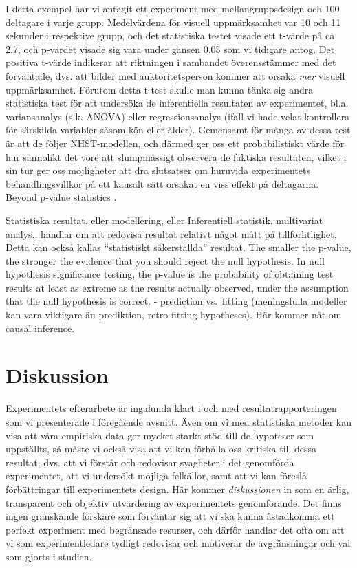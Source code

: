 \documentclass[
]{book}
\begin{document}
I detta exempel har vi antagit ett experiment med mellangruppsdesign och 100 deltagare i varje grupp. Medelvärdena för visuell uppmärksamhet var 10 och 11 sekunder i respektive grupp, och det statistiska testet visade ett t-värde på ca 2.7, och p-värdet visade sig vara under gänsen 0.05 som vi tidigare antog. Det positiva t-värde indikerar att riktningen i sambandet överensstämmer med det förväntade, dvs. att bilder med auktoritetsperson kommer att orsaka \emph{mer} visuell uppmärksamhet. Förutom detta t-test skulle man kunna tänka sig andra statistiska test för att undersöka de inferentiella resultaten av experimentet, bl.a. variansanalys (s.k. ANOVA) eller regressionsanalys (ifall vi hade velat kontrollera för särskilda variabler såsom kön eller ålder). Gemensamt för många av dessa test är att de följer NHST-modellen, och därmed ger oss ett probabilistiskt värde för hur sannolikt det vore att slumpmässigt observera de faktiska resultaten, vilket i sin tur ger oss möjligheter att dra slutsatser om huruvida experimentets behandlingsvillkor på ett kausalt sätt orsakat en viss effekt på deltagarna. Beyond p-value statistics \citep{trafimow2015editorial}.

Statistiska resultat, eller modellering, eller Inferentiell statistik, multivariat analys.. handlar om att redovisa resultat relativt något mått på tillförlitlighet. Detta kan också kallas ``statistiskt säkerställda'' resultat. The smaller the p-value, the stronger the evidence that you should reject the null hypothesis. In null hypothesis significance testing, the p-value is the probability of obtaining test results at least as extreme as the results actually observed, under the assumption that the null hypothesis is correct. - prediction vs.~fitting (meningsfulla modeller kan vara viktigare än prediktion, retro-fitting hypotheses). Här kommer nåt om causal inference.

\hypertarget{sec08.2}{%
\section{Diskussion}\label{sec08.2}}

Experimentets efterarbete är ingalunda klart i och med resultatrapporteringen som vi presenterade i föregående avsnitt. Även om vi med statistiska metoder kan visa att våra empiriska data ger mycket starkt stöd till de hypoteser som uppställts, så måste vi också visa att vi kan förhålla oss kritiska till dessa resultat, dvs. att vi förstår och redovisar svagheter i det genomförda experimentet, att vi undersökt möjliga felkällor, samt att vi kan föreslå förbättringar till experimentets design. Här kommer \emph{diskussionen} in som en ärlig, transparent och objektiv utvärdering av experimentets genomförande. Det finns ingen granskande forskare som förväntar sig att vi ska kunna åstadkomma ett perfekt experiment med begränsade resurser, och därför handlar det ofta om att vi som experimentledare tydligt redovisar och motiverar de avgränsningar och val som gjorts i studien.
\end{document}
